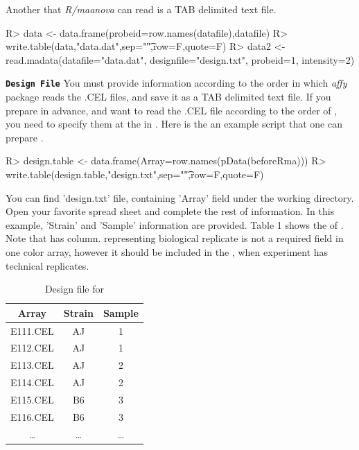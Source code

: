 Another  that {\em R/maanova} can read is a TAB delimited
text file.
\begin{Sinput}
R> data <- data.frame(probeid=row.names(datafile),datafile)
R> write.table(data,"data.dat",sep="\t",row=F,quote=F)
R> data2 <- read.madata(datafile="data.dat", designfile="design.txt", 
   probeid=1, intensity=2)
\end{Sinput}
{\bf {\tt Design File}} You must provide  information
according to the order in which {\em affy} package reads the .CEL files, and
save it as a TAB delimited text file. If you prepare  in advance, and want to read
the .CEL file according to the order of , you need to
specify them at the  in . Here is the
an example script that one can prepare .
\begin{Sinput}
R> design.table <- data.frame(Array=row.names(pData(beforeRma)))
R> write.table(design.table,"design.txt",sep="\t",row=F,quote=F) 
\end{Sinput}
You can find 'design.txt' file, containing 'Array' field under the working
directory. Open your favorite spread sheet and complete the rest of
information. In this example, 'Strain' and 'Sample' information are
provided. Table 1 shows the  of . Note
that  has  column.  representing biological replicate is not a required
field in one color array, however it should be included in the , when experiment has technical replicates.
\begin{table}[h]
\caption{Design file for }
\begin{center}
\begin{tabular}{ccc}\hline
Array & Strain & Sample\\\hline
E111.CEL& AJ& 1\\
E112.CEL& AJ& 1\\
E113.CEL& AJ& 2\\
E114.CEL& AJ& 2\\
E115.CEL& B6& 3\\
E116.CEL& B6& 3\\
\ldots & \ldots & \ldots\\\hline
\end{tabular}\\
\end{center}
\end{table}

